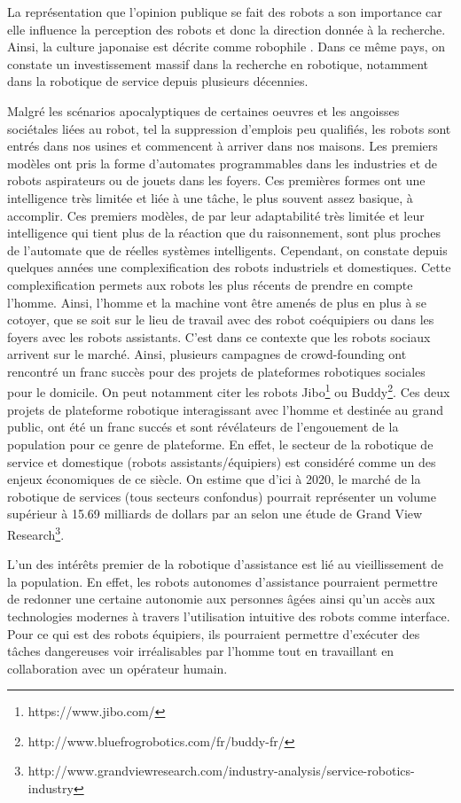 \documentclass[a4paper,11pt,twoside]{StyleThese}
\begin{document}
La représentation que l'opinion publique se fait des robots a son importance car elle influence la perception des robots \cite{Sundar2016} et donc la direction donnée à la recherche. Ainsi, la culture japonaise est décrite comme robophile \cite{gilson98}. Dans ce même pays, on constate un investissement massif dans la recherche en robotique, notamment dans la robotique de service depuis plusieurs décennies.

Malgré les scénarios apocalyptiques de certaines oeuvres et les angoisses sociétales liées au robot, tel la suppression d’emplois peu qualifiés, les robots sont entrés dans nos usines et commencent à arriver dans nos maisons. Les premiers modèles ont pris la forme d'automates programmables dans les industries et de robots aspirateurs ou de jouets dans les foyers. Ces premières formes ont une intelligence très limitée et liée à une tâche, le plus souvent assez basique, à accomplir. Ces premiers modèles, de par leur adaptabilité très limitée et leur intelligence qui tient plus de la réaction que du raisonnement, sont plus proches de l'automate que  de réelles systèmes intelligents. Cependant, on constate depuis quelques années une complexification des robots industriels et domestiques. Cette complexification permets aux robots les plus récents de prendre en compte l'homme. Ainsi, l'homme et la machine vont être amenés de plus en plus à se cotoyer, que se soit sur le lieu de travail avec des robot coéquipiers ou dans les foyers avec les robots assistants. C'est dans ce contexte que les robots sociaux arrivent sur le marché. Ainsi, plusieurs campagnes de crowd-founding ont rencontré un franc succès pour des projets de plateformes robotiques sociales pour le domicile. On peut notamment citer les robots Jibo\footnote{https://www.jibo.com/} ou Buddy\footnote{http://www.bluefrogrobotics.com/fr/buddy-fr/}. Ces deux projets de plateforme robotique interagissant avec l'homme et destinée au grand public, ont été un franc succés et sont révélateurs de l'engouement de la population pour ce genre de plateforme. En effet, le secteur de la robotique de service et domestique (robots assistants/équipiers) est considéré comme un des enjeux
économiques de ce siècle. On estime que d’ici à 2020, le marché de la robotique de services (tous secteurs confondus) pourrait représenter un volume supérieur à 15.69 milliards de dollars par an selon une étude de Grand View Research\footnote{http://www.grandviewresearch.com/industry-analysis/service-robotics-industry}. 

L'un des intérêts premier de la robotique d'assistance est lié au vieillissement de la population. En effet, les robots autonomes d'assistance pourraient permettre de redonner une certaine autonomie aux personnes âgées ainsi qu'un accès aux technologies modernes à travers l'utilisation intuitive des robots comme interface.
Pour ce qui est des robots équipiers, ils pourraient permettre d'exécuter des tâches dangereuses voir irréalisables par l'homme tout en travaillant en collaboration avec un opérateur humain. 
\end{document}
